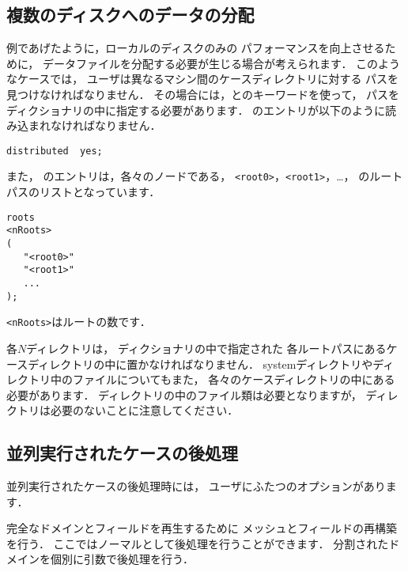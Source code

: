 \subsection{複数のディスクへのデータの分配}
\label{ssec:3.4.3}
例であげたように，ローカルのディスクのみの
パフォーマンスを向上させるために，
データファイルを分配する必要が生じる場合が考えられます．
このようなケースでは，
ユーザは異なるマシン間のケースディレクトリに対する
パスを見つけなければなりません．
その場合には，とのキーワードを使って，
パスをディクショナリの中に指定する必要があります．
%
%
のエントリが以下のように読み込まれなければなりません．
\begin{OFfile}
\begin{verbatim}
distributed  yes;
\end{verbatim}
\end{OFfile}
また，
%
%
のエントリは，各々のノードである，
\verb|<root0>|，\verb|<root1>|，\ldots，
のルートパスのリストとなっています．
\begin{OFfile}
\begin{verbatim}
roots
<nRoots>
(
   "<root0>"
   "<root1>"
   ...
);
\end{verbatim}
\end{OFfile}
\verb|<nRoots>|はルートの数です．

各$N$ディレクトリは，
ディクショナリの中で指定された
各ルートパスにあるケースディレクトリの中に置かなければなりません．
systemディレクトリやディレクトリ中のファイルについてもまた，
各々のケースディレクトリの中にある必要があります．
ディレクトリの中のファイル類は必要となりますが，
ディレクトリは必要のないことに注意してください．


\subsection{並列実行されたケースの後処理}
\label{ssec:3.4.4}
並列実行されたケースの後処理時には，
ユーザにふたつのオプションがあります．

完全なドメインとフィールドを再生するために
メッシュとフィールドの再構築を行う．
ここではノーマルとして後処理を行うことができます．
分割されたドメインを個別に引数で後処理を行う．

